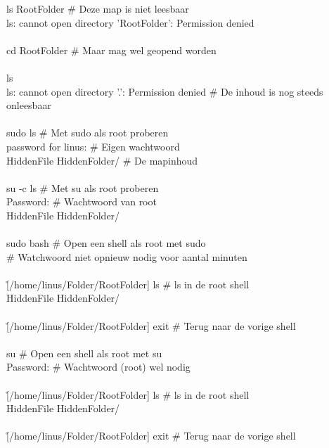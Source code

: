 \begin{bash}
\p[~/Folder] ls RootFolder                         \# Deze map is niet leesbaar\\
ls: cannot open directory 'RootFolder': Permission denied\\
\\
\p[~/Folder] cd RootFolder                         \# Maar mag wel geopend worden\\
\\
 ls\\
ls: cannot open directory '.': Permission denied           \# De inhoud is nog steeds onleesbaar\\
\\
 sudo ls                    \# Met sudo als root proberen\\
[sudo] password for linus:                                   \# Eigen wachtwoord\\
HiddenFile HiddenFolder/                                   \# De mapinhoud\\
\\
 su -c ls                   \# Met su als root proberen\\
Password:                                                  \# Wachtwoord van root\\
HiddenFile HiddenFolder/\\
\\
 sudo bash                  \# Open een shell als root met sudo\\
\# Watchwoord niet opnieuw nodig voor aantal minuten\\
\\
\r[/home/linus/Folder/RootFolder] ls                \# ls in de root shell\\
HiddenFile HiddenFolder/\\
\\
\r[/home/linus/Folder/RootFolder] exit              \# Terug naar de vorige shell\\
\\
 su                         \# Open een shell als root met su\\
Password:                                                  \# Wachtwoord (root) wel nodig\\
\\
\r[/home/linus/Folder/RootFolder] ls                \# ls in de root shell\\
HiddenFile HiddenFolder/\\
\\
\r[/home/linus/Folder/RootFolder] exit              \# Terug naar de vorige shell\\
\end{bash}

